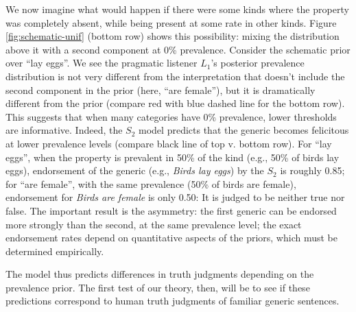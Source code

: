 \documentclass[12pt,letterpaper]{article}
\begin{document}
We now imagine what would happen if there were some kinds where the property was completely absent, while being present at some rate in other kinds.
Figure \ref{fig:schematic-unif} (bottom row) shows this possibility: mixing the distribution above it with a second component at 0\% prevalence.
Consider the schematic prior over ``lay eggs''.
We see the pragmatic listener $L_1$'s posterior prevalence distribution is not very different from the interpretation that doesn't include the second component in the prior (here, ``are female''), but it is dramatically different from the prior (compare red with blue dashed line for the bottom row).
This suggests that when many categories have 0\% prevalence, lower thresholds are informative. 
Indeed, the $S_2$ model predicts that the generic becomes felicitous at lower prevalence levels (compare black line of top v. bottom row).
For ``lay eggs'', when the property is prevalent in 50\% of the kind (e.g., 50\% of birds lay eggs), endorsement of the generic (e.g., \emph{Birds lay eggs}) by the $S_2$ is roughly 0.85; for ``are female'', with the same prevalence (50\% of birds are female), endorsement for \emph{Birds are female} is only 0.50: It is judged to be neither true nor false. 
The important result is the asymmetry: the first generic can be endorsed more strongly than the second, at the same prevalence level; the exact endorsement rates depend on quantitative aspects of the priors, which must be determined empirically.


%    



The model thus predicts differences in truth judgments depending on the prevalence prior. 
The first test of our theory, then, will be to see if these predictions correspond to human truth judgments of familiar generic sentences. 
\end{document}
